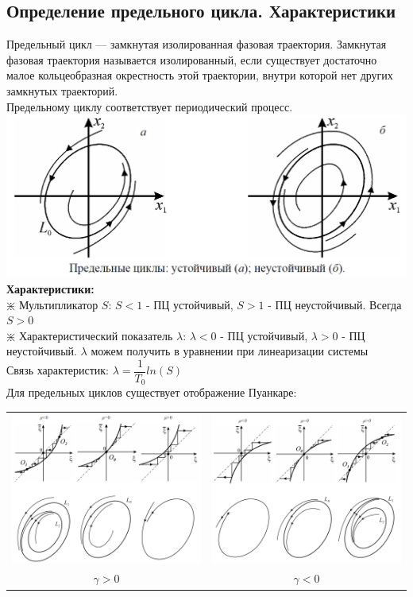 \begin{multicols*}{2}
		\section{Определение предельного цикла. Характеристики}
		Предельный цикл — замкнутая изолированная фазовая траектория. Замкнутая фазовая траектория называется изолированный, если существует достаточно малое кольцеобразная окрестность этой траектории, внутри которой нет других замкнутых траекторий.\\
		Предельному циклу соответствует периодический процесс.\\
		\includegraphics[width=0.7\linewidth]{tk_img/predel.png}\\
		\textbf{Характеристики:}\\
		$\divideontimes$ Мультипликатор $S$: $S<1$ - ПЦ устойчивый, $S>1$ - ПЦ неустойчивый. Всегда $S>0$\\
		$\divideontimes$ Характеристический показатель $\lambda$: $\lambda<0$ - ПЦ устойчивый, $\lambda>0$ - ПЦ неустойчивый. $\lambda$ можем получить в уравнении при линеаризации системы\\
		Связь характеристик: $\lambda = \dfrac{1}{T_0}ln(S)$ \\
		Для предельных циклов существует отображение Пуанкаре: \\
		\begin{tabular}{c | c}
			{\includegraphics[width=0.45\linewidth]{tk_img/predel_1.png}} & {\includegraphics[width=0.45\linewidth]{tk_img/predel_2.png}} \\
			{$\gamma > 0$} & {$\gamma < 0$}
		\end{tabular}
		

\end{multicols*}
